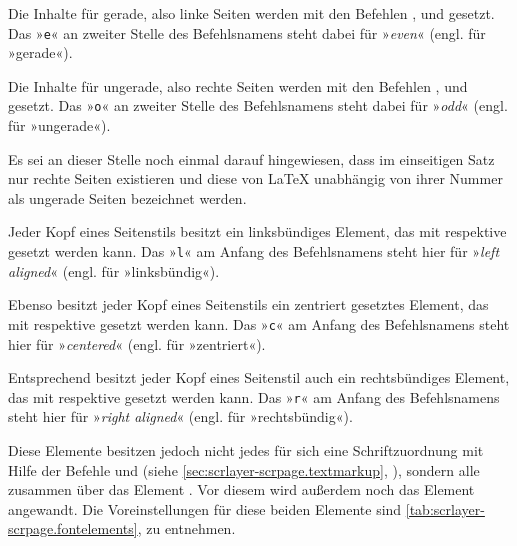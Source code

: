 Die Inhalte für gerade, also linke Seiten werden mit den
Befehlen ,  und  gesetzt. Das
»\texttt{e}« an zweiter Stelle des Befehlsnamens steht dabei für »\emph{even}«
(engl. für »gerade«).

Die Inhalte für ungerade, also rechte Seiten werden mit
den Befehlen ,  und  gesetzt. Das
»\texttt{o}« an zweiter Stelle des Befehlsnamens steht dabei für »\emph{odd}«
(engl. für »ungerade«).

Es sei an dieser Stelle noch einmal darauf hingewiesen,
dass im einseitigen Satz nur rechte Seiten existieren und diese von \LaTeX{}
unabhängig von ihrer Nummer als ungerade Seiten bezeichnet werden.

Jeder Kopf eines Seitenstils besitzt ein linksbündiges
Element, das mit  respektive  gesetzt werden
kann. Das »\texttt{l}« am Anfang des Befehlsnamens steht hier für »\emph{left
  aligned}« (engl. für »linksbündig«).

Ebenso besitzt jeder Kopf eines Seitenstils ein zentriert
gesetztes Element, das mit  respektive  gesetzt
werden kann. Das »\texttt{c}« am Anfang des Befehlsnamens steht hier für
»\emph{centered}« (engl. für »zentriert«).

Entsprechend besitzt jeder Kopf eines Seitenstil auch ein
rechtsbündiges Element, das mit 
respektive  gesetzt werden kann. Das »\texttt{r}« am Anfang des
Befehlsnamens steht hier für »\emph{right aligned}« (engl. für
»rechtsbündig«).

\BeginIndexGroup
{}%
%
Diese Elemente besitzen jedoch nicht jedes für sich eine Schriftzuordnung mit
Hilfe der Befehle  und  (siehe
\autoref{sec:scrlayer-scrpage.textmarkup},
), sondern alle zusammen
über das Element . Vor
diesem wird außerdem noch das Element
angewandt. Die Voreinstellungen für diese beiden Elemente sind
\autoref{tab:scrlayer-scrpage.fontelements},
 zu entnehmen.%
\EndIndexGroup

